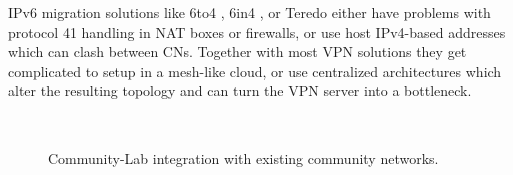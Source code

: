 \documentclass[conference]{IEEEtran}
\begin{document}

IPv6 migration solutions like 6to4 \cite{6to4}, 6in4 \cite{6in4},
or Teredo \cite{teredo} either have problems with protocol 41
handling in NAT boxes or firewalls, or use host IPv4-based addresses which can
clash between CNs.  Together with most VPN solutions they get complicated to
setup in a mesh-like cloud, or use centralized architectures which alter the
resulting topology and can turn the VPN server into a bottleneck.


\begin{figure}[!t]
 \centering
 \\
 \caption{Community-Lab integration with existing community networks.}
\end{figure}
\end{document}
